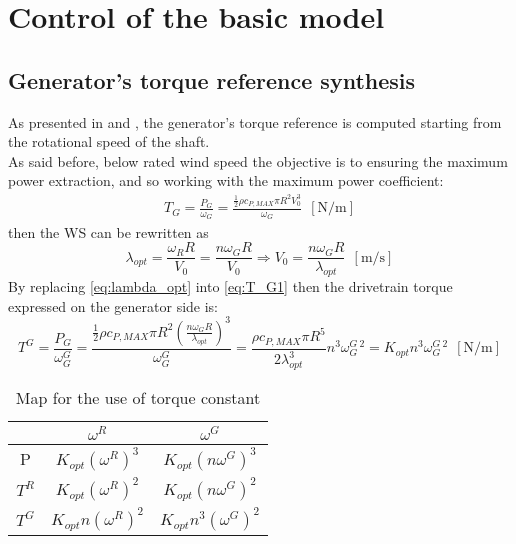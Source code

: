 \newpage
\section{Control of the basic model}\label{sec:c_basic_model_control}

\subsection{Generator's torque reference synthesis}\label{subsec:torque_reference}
As presented in \cite{Aerodynamics_of_wind_turbines} and \cite{SMILDEN2016386}, the generator's torque reference is computed starting from the rotational speed of the shaft. \\
As said before, below rated wind speed the objective is to ensuring the maximum power extraction, and so working with the maximum power coefficient:
\begin{gather}
    T_G=\frac{P_G}{\omega_G}=\frac{\frac{1}{2}\rho c_{P,MAX} \pi R^2 V_0^3}{\omega_G} \ \ \left[\si{\newton\per\meter}\right]
    \label{eq:T_G1}
\end{gather}
then the \acrshort{WS} can be rewritten as
\begin{equation}
    \lambda_{opt} = \frac{\omega_R R}{V_0} = \frac{n \omega_G R}{V_0} \Rightarrow V_0=\frac{n\omega_G R}{\lambda_{opt}}  \ \ \left[\si{\meter\per\second}\right]
    \label{eq:lambda_opt}
\end{equation}
By replacing \autoref{eq:lambda_opt} into \autoref{eq:T_G1} then the drivetrain torque expressed on the generator side is:
\begin{equation}
    T^G=\frac{P_G}{\omega_G^G}=\frac{\frac{1}{2}\rho c_{P,MAX} \pi R^2 \left(\frac{n\omega_G R}{\lambda_{opt}}\right)^3}{\omega_G^G} = \frac{\rho c_{P, MAX} \pi R^5 }{2 \lambda_{opt}^3}n^3\omega_G^{G \ 2} = K_{opt}n^3\omega_G^{G \ 2}  \ \ \left[\si{\newton\per\meter}\right]
    \label{eq:T_G2}
\end{equation}

\begin{table}[htb]
    \centering
    \begin{tabular}{ccc}
    \toprule
         & $\omega^R$ & $\omega^G$  \\ \midrule
         P & $K_{opt} \left(\omega^{R}\right)^3$ & $K_{opt}\left(n \omega^{G}\right)^3$\\
         $T^R$ & $K_{opt} \left( \omega^{R}\right)^2$ & $K_{opt}\left(n \omega^{G}\right)^2$\\
         $T^G$ & $K_{opt} n \left(\omega^{R}\right)^2$ &  $K_{opt} n^3\left(\omega^{G}\right)^2$\\ \bottomrule
    \end{tabular}
    \caption{Map for the use of torque constant}
    \label{tab:gain_map}
\end{table}

